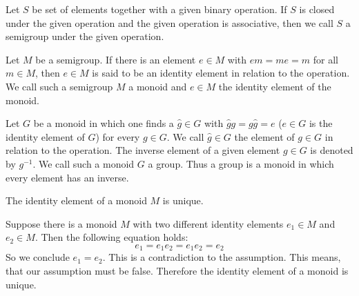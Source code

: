 \documentclass[landscape, slides, light]{mmiss2}[19.02.2002]
\begin{document}
\begin{Package}
\begin{Section}
\begin{Section}[Title={Mathematical Background},Label=Section1.4]
\begin{Paragraph}[Label=para14]
\begin{Definition}[Notation=Algebra,Label=Definition1.4.1,Title=Semigroup]
Let $S$ be  set of elements together with a given binary operation. If $S$
is closed under the given operation and the given operation is
associative, then we call $S$ a semigroup under the given operation.
\end{Definition}
\newline
\begin{Definition}[Notation=Algebra,Label=Definition1.4.2,Title=Monoid]
Let $M$ be a semigroup. If there is an element $e \in M$ with
$em=me=m$ for all $m \in M$, then $e \in M$ is said to be an identity
element in relation to the operation. We call such a semigroup $M$ a
monoid and $e \in M$ the identity element of the monoid.
\end{Definition}
\newline
\begin{Definition}[Notation=Algebra,Label=Definition1.4.3,Title=Group]
Let $G$ be a monoid in which one finds a $\hat{g} \in G$ with
$\hat{g}g=g\hat{g}=e$ ($e \in G$ is the identity element of $G$) for
every $g \in G$. We call $\hat{g} \in G$ the
 element of $g \in G$ in relation to
the operation. The inverse element of a given
element $g \in G$ is denoted by $g^{-1}$. We call such a monoid $G$ a
group. Thus a group is a monoid in which every element has an inverse.
\end{Definition}
\newline
\begin{Theorem}[Notation=Algebra,Label=Theorem1.4.1,Title={Uniqueness 1a}]
The identity element of a monoid $M$ is unique.
\end{Theorem}

\begin{Proof}[Notation=Algebra,Label=Proof1.4.1.1,Title=Contradiction]
Suppose there is a monoid $M$ with two different identity elements $e_{1}
\in M$ and $e_{2} \in M$. Then the following equation holds:
\begin{displaymath}
e_{1}=e_{1}e_{2}=e_{1}e_{2}=e_{2}
\end{displaymath}
So we conclude $e_{1}=e_{2}$. This is a contradiction to the
assumption. This means, that our assumption must be false. Therefore
the identity element of a monoid is unique.
\end{Proof}


\end{Paragraph}
\end{Section}
\end{Section}
\end{Package}
\end{document}

